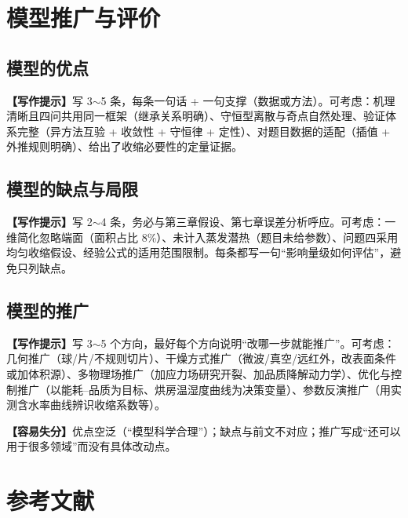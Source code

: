 \documentclass[12pt,a4paper]{article}
\newcommand{\prompt}[1]{\par\noindent\textbf{【写作提示】}#1\par}      %
\newcommand{\pitfall}[1]{\par\noindent\textbf{【容易失分】}#1\par}     %
\begin{document}
\clearpage

\section{模型推广与评价}

\subsection{模型的优点}

\prompt{写 3$\sim$5 条，每条一句话 + 一句支撑（数据或方法）。可考虑：机理清晰且四问共用同一框架（继承关系明确）、守恒型离散与奇点自然处理、验证体系完整（异方法互验 + 收敛性 + 守恒律 + 定性）、对题目数据的适配（插值 + 外推规则明确）、给出了收缩必要性的定量证据。}

\subsection{模型的缺点与局限}

\prompt{写 2$\sim$4 条，务必与第三章假设、第七章误差分析呼应。可考虑：一维简化忽略端面（面积占比 8\%）、未计入蒸发潜热（题目未给参数）、问题四采用均匀收缩假设、经验公式的适用范围限制。每条都写一句“影响量级如何评估”，避免只列缺点。}

\subsection{模型的推广}

\prompt{写 3$\sim$5 个方向，最好每个方向说明“改哪一步就能推广”。可考虑：几何推广（球/片/不规则切片）、干燥方式推广（微波/真空/远红外，改表面条件或加体积源）、多物理场推广（加应力场研究开裂、加品质降解动力学）、优化与控制推广（以能耗–品质为目标、烘房温湿度曲线为决策变量）、参数反演推广（用实测含水率曲线辨识收缩系数等）。}

\pitfall{优点空泛（“模型科学合理”）；缺点与前文不对应；推广写成“还可以用于很多领域”而没有具体改动点。}

\clearpage

\section{参考文献}
\end{document}
